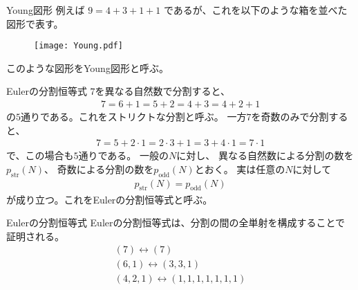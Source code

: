\documentclass[\main/TL_liquid.tex]{subfiles}
\begin{document}
\begin{frame}{Young図形}
    例えば
    $
        9 = 4+3+1+1
    $
    であるが、これを以下のような箱を並べた図形で表す。
    \begin{figure}[H]
        \centering
        \texttt{[image: Young.pdf]}
    \end{figure}
    このような図形をYoung図形と呼ぶ。
\end{frame}


\begin{frame}{Eulerの分割恒等式}
    $7$を異なる自然数で分割すると、
    \begin{align}
        7 = 6+1 = 5+2 = 4+3 = 4+2+1
    \end{align}
    の$5$通りである。これをストリクトな分割と呼ぶ。
    一方$7$を奇数のみで分割すると、
    \begin{align}
        7 = 5+2\cdot1 = 2\cdot3+1 = 3+4\cdot1 = 7\cdot1
    \end{align}
    で、この場合も$5$通りである。
    一般の$N$に対し、
    異なる自然数による分割の数を$p_{\mathrm{str}}(N)$、
    奇数による分割の数を$p_{\mathrm{odd}}(N)$とおく。
    実は任意の$N$に対して
    \begin{align}
        p_{\mathrm{str}}(N) = p_{\mathrm{odd}}(N)
    \end{align}
    が成り立つ。これをEulerの分割恒等式と呼ぶ。
\end{frame}

\begin{frame}{Eulerの分割恒等式}
    Eulerの分割恒等式は、分割の間の全単射を構成することで証明される。
    \begin{gather*}
        (7) \leftrightarrow (7)
        \\[10pt]
        (6,1) \leftrightarrow (3,3,1)
        \\[10pt]
        (4,2,1) \leftrightarrow (1,1,1,1,1,1,1)
    \end{gather*}
\end{frame}
\end{document}
